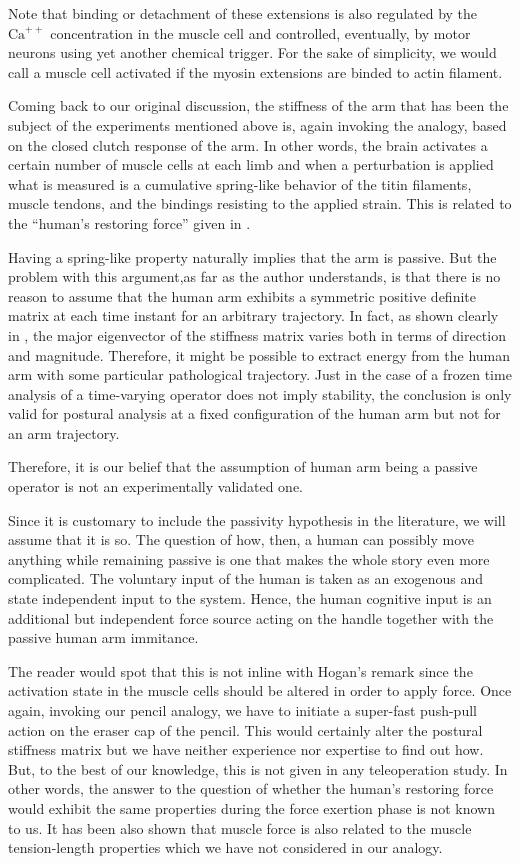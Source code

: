 Note that binding or detachment of these extensions is also regulated by the $\mathrm{Ca}^{++}$ concentration in the muscle cell 
and controlled, eventually, by motor neurons using yet another chemical trigger. For the sake of simplicity, we would call a muscle 
cell activated if the myosin extensions are binded to actin filament.


Coming back to our original discussion, the stiffness of the arm that has been the subject of the experiments mentioned 
above is, again invoking the analogy, based on the closed clutch response of the arm. In other words, the brain activates a certain
number of muscle cells at each limb and when a perturbation is applied what is measured is a cumulative spring-like behavior of the 
titin filaments, muscle tendons, and the bindings resisting to the applied strain. This is related to the \enquote{human's restoring force}
given in . 

Having a spring-like property naturally implies that the arm is passive. But the problem with this argument,as far as the author understands,
is that there is no reason to assume that the human arm exhibits a symmetric positive definite matrix at each time instant for an arbitrary trajectory. 
In fact, as shown clearly in \cite{mussa85}, the major eigenvector of the stiffness matrix varies both in terms of 
direction and magnitude. Therefore, it might be possible to extract energy from the human arm with some particular 
pathological trajectory. Just in the case of a frozen time analysis of a time-varying operator does not imply stability, the 
conclusion is only valid for postural analysis at a fixed configuration of the human arm but not for an arm trajectory. 

Therefore, it is our belief that the assumption of human arm being a passive operator is not an experimentally validated one. 
 


Since it is customary to include the passivity hypothesis in the literature, we will assume that it is so. The question of how, 
then, a human can possibly move anything while remaining passive is one that makes the whole 
story even more complicated. The voluntary input of the human is taken as an exogenous and state independent input to the system. 
Hence, the human cognitive input is an additional but independent force source acting on the handle together with the passive 
human arm immitance.


The reader would spot that this is not inline with Hogan's remark since the activation state in the muscle cells should be altered in 
order to apply force. Once again, invoking our pencil analogy, we have to initiate a super-fast push-pull action on the eraser cap 
of the pencil. This would certainly alter the postural stiffness matrix but we have neither experience nor expertise to find out how. 
But, to the best of our knowledge, this is not given in any teleoperation study. In other words, the answer to the question of whether 
the human's restoring force would exhibit the same properties during the force exertion phase is not known to us. It has been also shown 
that muscle force is also related to the muscle tension-length properties \cite{eltit} which we have not considered in our analogy.

